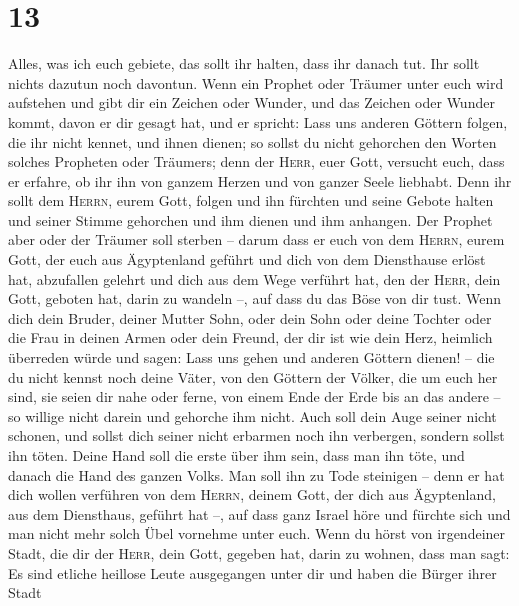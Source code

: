 \hypertarget{section-12}{%
\section{13}\label{section-12}}

 Alles, was ich euch gebiete, das sollt ihr halten, dass
ihr danach tut. Ihr sollt nichts dazutun noch davontun. 
Wenn ein Prophet oder Träumer unter euch wird aufstehen und gibt dir ein
Zeichen oder Wunder,  und das Zeichen oder Wunder kommt,
davon er dir gesagt hat, und er spricht: Lass uns anderen Göttern
folgen, die ihr nicht kennet, und ihnen dienen;  so sollst
du nicht gehorchen den Worten solches Propheten oder Träumers; denn der
\textsc{Herr}, euer Gott, versucht euch, dass er erfahre, ob ihr ihn von
ganzem Herzen und von ganzer Seele liebhabt.  Denn ihr
sollt dem \textsc{Herrn}, eurem Gott, folgen und ihn fürchten und seine
Gebote halten und seiner Stimme gehorchen und ihm dienen und ihm
anhangen.  Der Prophet aber oder der Träumer soll sterben
-- darum dass er euch von dem \textsc{Herrn}, eurem Gott, der euch aus
Ägyptenland geführt und dich von dem Diensthause erlöst hat, abzufallen
gelehrt und dich aus dem Wege verführt hat, den der \textsc{Herr}, dein
Gott, geboten hat, darin zu wandeln --, auf dass du das Böse von dir
tust.  Wenn dich dein Bruder, deiner Mutter Sohn, oder
dein Sohn oder deine Tochter oder die Frau in deinen Armen oder dein
Freund, der dir ist wie dein Herz, heimlich überreden würde und sagen:
Lass uns gehen und anderen Göttern dienen! -- die du nicht kennst noch
deine Väter,  von den Göttern der Völker, die um euch her
sind, sie seien dir nahe oder ferne, von einem Ende der Erde bis an das
andere --  so willige nicht darein und gehorche ihm nicht.
Auch soll dein Auge seiner nicht schonen, und sollst dich seiner nicht
erbarmen noch ihn verbergen,  sondern sollst ihn töten.
Deine Hand soll die erste über ihm sein, dass man ihn töte, und danach
die Hand des ganzen Volks.  Man soll ihn zu Tode
steinigen -- denn er hat dich wollen verführen von dem \textsc{Herrn},
deinem Gott, der dich aus Ägyptenland, aus dem Diensthaus, geführt hat
--,  auf dass ganz Israel höre und fürchte sich und man
nicht mehr solch Übel vornehme unter euch.  Wenn du hörst
von irgendeiner Stadt, die dir der \textsc{Herr}, dein Gott, gegeben
hat, darin zu wohnen, dass man sagt:  Es sind etliche
heillose Leute ausgegangen unter dir und haben die Bürger ihrer Stadt
